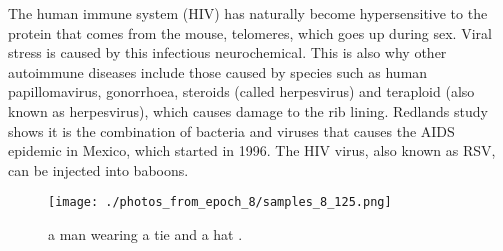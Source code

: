\documentclass{article}%
\begin{document}
The human immune system (HIV) has naturally become hypersensitive to the protein that comes from the mouse, telomeres, which goes up during sex. Viral stress is caused by this infectious neurochemical. This is also why other autoimmune diseases include those caused by species such as human papillomavirus, gonorrhoea, steroids (called herpesvirus) and teraploid (also known as herpesvirus), which causes damage to the rib lining.\newline%
Redlands study shows it is the combination of bacteria and viruses that causes the AIDS epidemic in Mexico, which started in 1996. The HIV virus, also known as RSV, can be injected into baboons.\newline%

%


\begin{figure}[h!]%
\centering%
\texttt{[image: ./photos\_from\_epoch\_8/samples\_8\_125.png]}%
\caption{a man wearing a tie and a hat .}%
\end{figure}

%
\end{document}
